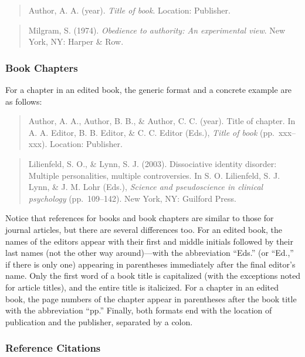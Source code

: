 \documentclass[
]{krantz}
\begin{document}
\begin{quote}
Author, A. A. (year). \emph{Title of book}. Location: Publisher.
\end{quote}

\begin{quote}
Milgram, S. (1974). \emph{Obedience to authority: An experimental view}. New York, NY: Harper \& Row.
\end{quote}

\subsubsection*{Book Chapters}\label{book-chapters}


For a chapter in an edited book, the generic format and a concrete example are as follows:

\begin{quote}
Author, A. A., Author, B. B., \& Author, C. C. (year). Title of chapter. In A. A. Editor, B. B. Editor, \& C. C. Editor (Eds.), \emph{Title of book} (pp.~xxx--xxx). Location: Publisher.
\end{quote}

\begin{quote}
Lilienfeld, S. O., \& Lynn, S. J. (2003). Dissociative identity disorder: Multiple personalities, multiple controversies. In S. O. Lilienfeld, S. J. Lynn, \& J. M. Lohr (Eds.), \emph{Science and pseudoscience in clinical psychology} (pp.~109--142). New York, NY: Guilford Press.
\end{quote}

Notice that references for books and book chapters are similar to those for journal articles, but there are several differences too. For an edited book, the names of the editors appear with their first and middle initials followed by their last names (not the other way around)---with the abbreviation ``Eds.'' (or ``Ed.,'' if there is only one) appearing in parentheses immediately after the final editor's name. Only the first word of a book title is capitalized (with the exceptions noted for article titles), and the entire title is italicized. For a chapter in an edited book, the page numbers of the chapter appear in parentheses after the book title with the abbreviation ``pp.'' Finally, both formats end with the location of publication and the publisher, separated by a colon.

\subsubsection*{Reference Citations}\label{reference-citations}
\end{document}
